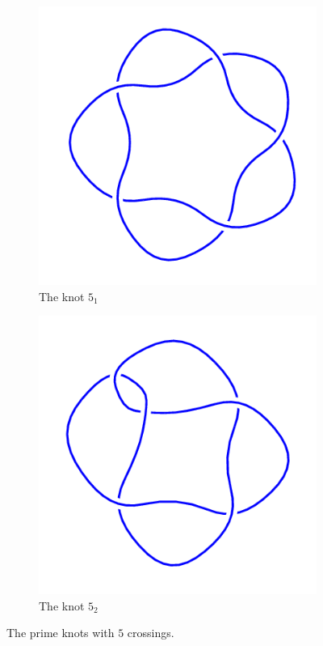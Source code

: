 \documentclass[12pt,letterpaper]{article}
\theoremstyle{definition}
\begin{document}
\begin{figure}[h]
    \centering
    \begin{subfigure}{.4\textwidth}
        \centering
        \includegraphics[width=\textwidth]{rgp12pics/5_1.png}
        \caption{The knot $5_1$}
    \end{subfigure}
    \hspace{1in}
    \begin{subfigure}{.4\textwidth}
        \centering
        \includegraphics[width=\textwidth]{rgp12pics/5_2.png}
        \caption{The knot $5_2$}
    \end{subfigure}
    \caption{The prime knots with $5$ crossings.}
\end{figure}
\end{document}
